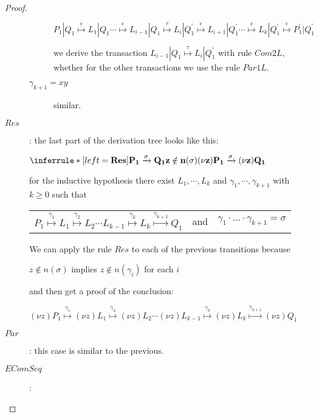 \begin{proposition}
\begin{proof}
\begin{description}
\begin{description}
\begin{center}
	      $
		  P_{1}|Q_{1} \stackrel{\epsilon}{\longmapsto} L_{1}|Q_{1} 
		  \cdots
			      \stackrel{\epsilon}{\longmapsto} L_{i-1}|Q_{1} 
			      \stackrel{\tau}{\longmapsto} L_{i}|Q_{1}^{'}
			      \stackrel{\epsilon}{\longmapsto} L_{i+1}|Q_{1}^{'}
		  \cdots 
			      \stackrel{\epsilon}{\longmapsto} L_{k}|Q_{1}^{'}
			      \stackrel{\epsilon}{\longmapsto} P_{1}^{'}|Q_{1}^{'}$	  
	    \end{center}
	    we derive the transaction $ L_{i-1}|Q_{1} \stackrel{\tau}{\longmapsto} L_{i}|Q_{1}^{'}$ with rule $Com2L$, whether for the other transactions  we use the rule $Par1L$.
	  \item[$\gamma_{k+1}=xy$] similar.
	\end{description}
      \item[$Res$]: 
	the last part of the derivation tree looks like this:
	\begin{center}
	  $\inferrule* [left=\bf{Res}]{
	      P_{1} \xrightarrow{\sigma} Q_{1}
	    \\
	      z\notin n(\sigma)
	  }{
	    (\nu z) P_{1} \xrightarrow{\sigma} (\nu z) Q_{1}
	  }$
	\end{center}
	for the inductive hypothesis there exist $L_{1}, \cdots, L_{k}$ and $\gamma_{1}, \cdots, \gamma_{k+1}$ with $k\geq 0$ such that 
	\begin{center}
	  \begin{tabular}{lll}
	    $P_{1} \stackrel{\gamma_{1}}{\longmapsto} L_{1}  \stackrel{\gamma_{2}}{\longmapsto} L_{2} \cdots L_{k-1} \stackrel{\gamma_{k}}{\longmapsto} L_{k} \stackrel{\gamma_{k+1}}{\longmapsto} Q_{1}$ 
	  &
	    and
	  &
	    $\gamma_{1} \cdot \ldots \cdot \gamma_{k+1} =  \sigma$
	  \end{tabular}
	\end{center}
	We can apply the rule $Res$ to each of the previous transitions because 
	\begin{center}
	  $z\notin n(\sigma)$ implies $z\notin n(\gamma_{i})$ for each $i$
	\end{center}
	and then get a proof of the conclusion:
	\begin{center}
	  $(\nu z)P_{1} \stackrel{\gamma_{1}}{\longmapsto} (\nu z)L_{1}  \stackrel{\gamma_{2}}{\longmapsto} (\nu z)L_{2} \cdots (\nu z)L_{k-1} \stackrel{\gamma_{k}}{\longmapsto} (\nu z)L_{k} \stackrel{\gamma_{k+1}}{\longmapsto} (\nu z)Q_{1}$
	\end{center}
      \item[$Par$]: this case is similar to the previous.
      \item[$EComSeq$]: 

\end{description}
\end{proof}
\end{proposition}
